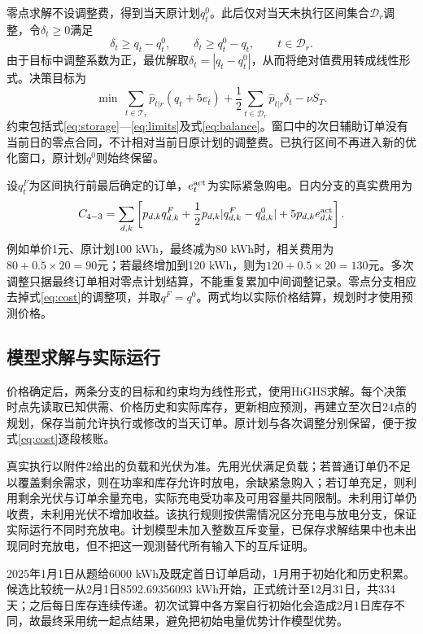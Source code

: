 \documentclass[11pt,a4paper]{article}
\begin{document}
零点求解不设调整费，得到当天原计划$q_t^0$。此后仅对当天未执行区间集合$\mathcal D_r$调整，令$\delta_t\ge0$满足
\begin{equation}
 \delta_t\ge q_t-q_t^0,\qquad \delta_t\ge q_t^0-q_t,
 \qquad t\in\mathcal D_r.
\end{equation}
由于目标中调整系数为正，最优解取$\delta_t=|q_t-q_t^0|$，从而将绝对值费用转成线性形式。决策目标为
\begin{equation}
 \min\ \sum_{t\in\mathcal T_r}\widehat p_{t|r}(q_t+5e_t)
 +\frac12\sum_{t\in\mathcal D_r}\widehat p_{t|r}\delta_t-\nu S_T.
 \label{eq:intraday}
\end{equation}
约束包括式\eqref{eq:storage}—\eqref{eq:limits}及式\eqref{eq:balance}。窗口中的次日辅助订单没有当前日的零点合同，不计相对当前日原计划的调整费。已执行区间不再进入新的优化窗口，原计划$q^0$则始终保留。

设$q_t^F$为区间执行前最后确定的订单，$e_t^{\rm act}$为实际紧急购电。日内分支的真实费用为
\begin{equation}
 C_{4-3}=\sum_{d,k}\left[p_{d,k}q_{d,k}^{F}
 +\frac12p_{d,k}|q_{d,k}^{F}-q_{d,k}^{0}|
 +5p_{d,k}e_{d,k}^{\rm act}\right].
 \label{eq:cost}
\end{equation}
例如单价1元、原计划100 kWh，最终减为80 kWh时，相关费用为$80+0.5\times20=90$元；若最终增加到120 kWh，则为$120+0.5\times20=130$元。多次调整只据最终订单相对零点计划结算，不能重复累加中间调整记录。零点分支相应去掉式\eqref{eq:cost}的调整项，并取$q^F=q^0$。两式均以实际价格结算，规划时才使用预测价格。

\subsection{模型求解与实际运行}

价格确定后，两条分支的目标和约束均为线性形式，使用HiGHS求解。每个决策时点先读取已知供需、价格历史和实际库存，更新相应预测，再建立至次日24点的规划，保存当前允许执行或修改的当天订单。原计划与各次调整分别保留，便于按式\eqref{eq:cost}逐段核账。

真实执行以附件2给出的负载和光伏为准。先用光伏满足负载；若普通订单仍不足以覆盖剩余需求，则在功率和库存允许时放电，余缺紧急购入；若订单充足，则利用剩余光伏与订单余量充电，实际充电受功率及可用容量共同限制。未利用订单仍收费，未利用光伏不增加收益。该执行规则按供需情况区分充电与放电分支，保证实际运行不同时充放电。计划模型未加入整数互斥变量，已保存求解结果中也未出现同时充放电，但不把这一观测替代所有输入下的互斥证明。

2025年1月1日从题给6000 kWh及既定首日订单启动，1月用于初始化和历史积累。候选比较统一从2月1日8592.69356093 kWh开始，正式统计至12月31日，共334天；之后每日库存连续传递。初次试算中各方案自行初始化会造成2月1日库存不同，故最终采用统一起点结果，避免把初始电量优势计作模型优势。
\end{document}
